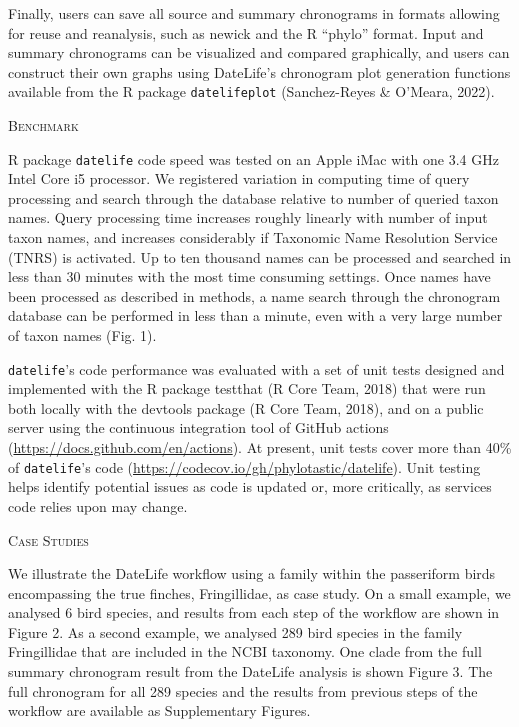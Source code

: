 \documentclass[english,man]{apa6}
\begin{document}
Finally, users can save all source and summary chronograms in formats allowing for reuse and reanalysis, such as newick and the R \enquote{phylo} format. Input and summary chronograms can be visualized and compared graphically, and users can construct their own graphs using DateLife's chronogram plot generation functions available from the R package \texttt{datelifeplot} (Sanchez-Reyes \& O'Meara, 2022).

\begin{center}
\textsc{Benchmark}
\end{center}

R package \texttt{datelife} code speed was tested on an Apple iMac
with one 3.4 GHz Intel Core i5 processor.
We registered variation in computing time of query processing and search through the database relative to number of queried taxon names.
Query processing time increases roughly linearly with number of input taxon names, and
increases considerably if Taxonomic Name Resolution Service (TNRS) is activated.
Up to ten thousand names can be processed and searched in less than 30 minutes with the most time consuming settings.
Once names have been processed as described in methods, a name search through the chronogram database can be performed in less than a minute, even with a very large number of taxon names (Fig. 1).

\texttt{datelife}'s code performance was evaluated with a set of unit tests designed and
implemented with the R package testthat (R Core Team, 2018) that were run both locally
with the devtools package (R Core Team, 2018), and on a public server using the continuous integration tool of GitHub actions (\url{https://docs.github.com/en/actions}).
At present, unit tests cover more than 40\% of \texttt{datelife}'s code (\url{https://codecov.io/gh/phylotastic/datelife}).
Unit testing helps identify potential issues as code is updated or, more critically, as services code relies upon may change.

\begin{center}
\textsc{Case Studies}
\end{center}

We illustrate the DateLife workflow using a family within the passeriform birds encompassing the true finches, Fringillidae, as case study. On a small example, we analysed 6 bird species, and results from each step of the workflow are shown in Figure 2. As a second example, we analysed 289 bird species in the family Fringillidae that are included in the NCBI taxonomy. One clade from the full summary chronogram result from the DateLife analysis is shown Figure 3. The full chronogram for all 289 species and the results from previous steps of the workflow are available as Supplementary Figures.
\end{document}
